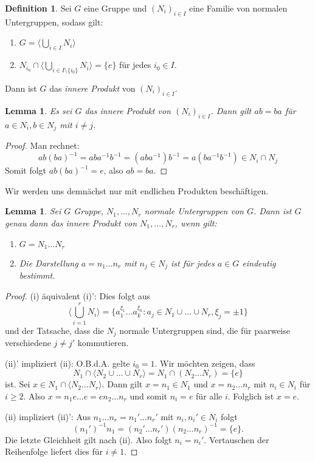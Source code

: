 \documentclass[12pt]{scrartcl} %
\newcommand{\inv}[1]{\left(#1\right)^{-1}}
\newcommand{\Inv}[1]{#1^{-1}}
\newtheorem{lemma}[thm]{Lemma}
\theoremstyle{definition}
\newtheorem*{defn}{Definition}
\theoremstyle{remark}
\begin{document}
\begin{defn}
	Sei $G$ eine Gruppe und $(N_i)_{i\in I}$ eine Familie von normalen Untergruppen, sodass gilt:
	\begin{enumerate}[label=(\roman*)]
		\item $G=\langle\bigcup_{i\in I} N_i\rangle$
		\item $N_{i_0} \cap \langle\bigcup_{i\in I \setminus \{i_0\}} N_i\rangle = \{e\}$ für jedes $i_0\in I$.
	\end{enumerate}
	Dann ist $G$ das \emph{innere Produkt} von $(N_i)_{i\in I}$.
\end{defn}

\begin{lemma}
	Es sei $G$ das innere Produkt von $(N_i)_{i\in I}$.
	Dann gilt $ab=ba$ für $a\in N_i, b\in N_j$ mit $i\neq j$.
\end{lemma}

\begin{proof}
	Man rechnet: $$ab\inv{ba}=ab\Inv{a}\Inv{b}=(ab\Inv{a})\Inv{b}=a(b\Inv{a}\Inv{b}) \in N_i\cap N_j$$
	Somit folgt $ab\inv{ba}=e$, also $ab=ba$.
\end{proof}

Wir werden uns demnächst nur mit endlichen Produkten beschäftigen.

\begin{lemma}
	Sei $G$ Gruppe, $N_1,\dots,N_r$ normale Untergruppen von $G$.
	Dann ist $G$ genau dann das innere Produkt von $N_1,\dots,N_r$, wenn gilt:
	\begin{enumerate}[label=(\roman*)']
		\item $G=N_1\dots N_r$
		\item Die Darstellung $a=n_1\dots n_r$ mit $n_j\in N_j$ ist für jedes $a\in G$ eindeutig bestimmt.
	\end{enumerate}
\end{lemma}

\begin{proof}
	(i) äquivalent (i)': Dies folgt aus $$\langle\bigcup_{i=1}^r N_i\rangle = \{a_1^{\xi_1}\dots a_k^{\xi_k}: a_j\in N_1\cup\dots \cup N_r, \xi_j = \pm 1\}$$ und der Tatsache, dass die $N_j$ normale Untergruppen sind, die für paarweise verschiedene $j\neq j'$ kommutieren.

	(ii)' impliziert (ii): O.B.d.A. gelte $i_0=1$.
	Wir möchten zeigen, dass $$N_1\cap \langle N_2\cup\dots \cup N_r\rangle = N_1 \cap (N_2\dots N_r)= \{e\}$$ ist.
	Sei $x\in N_1\cap \langle N_2\dots N_r\rangle$.
	Dann gilt $x=n_1\in N_1$ und $x=n_2\dots n_r$ mit $n_i\in N_i$ für $i\geq 2$.
	Also $x=n_1e\dots e=en_2\dots n_r$ und somit $n_i=e$ für alle $i$.
	Folglich ist $x=e$.

	(ii) impliziert (ii)': Aus $n_1\dots n_r=n_1'\dots n_r'$ mit $n_i,n_i'\in N_i$ folgt $$\inv{n_1'}n_1=(n_2'\dots n_r')\inv{n_2\dots n_r} = \{e\}.$$
	Die letzte Gleichheit gilt nach (ii).
	Also folgt $n_i=n_i'$.
	Vertauschen der Reihenfolge liefert dies für $i\neq 1$.
\end{proof}
\end{document}
